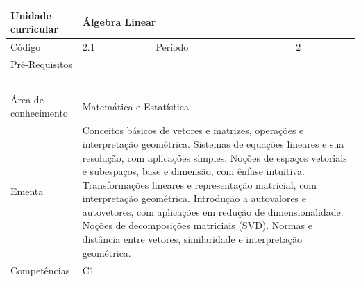 \begin{quadro}[ht!]
  \centering\scriptsize
\caption{Unidade Curricular Álgebra Linear}

\begin{tabular}{|p{2.5cm}|p{2.5cm}|p{2.5cm}|p{2.5cm}|p{2.5cm}|}\hline

  Unidade curricular & \multicolumn{4}{p{10cm}|}{ Álgebra Linear }\\\hline
  Código & 2.1 & Período & \multicolumn{2}{p{5cm}|}{ 2 }\\\hline
  Pré-Requisitos & \multicolumn{4}{p{10cm}|}{  } \\\hline
  \cellcolor{blue1}{ CH PRESENCIAL } &
    \cellcolor{blue1}{CH EAD Síncrona} &
    \cellcolor{blue1}{CH EAD Síncrona Mediada} &
    \cellcolor{blue1}{CH EAD Assíncrona} &
    \cellcolor{blue1}{CH APCC} \\\hline
  \cellcolor{blue1}{ 45 } &
    \cellcolor{blue1}{ 0 } &
    \cellcolor{blue1}{ 0 } &
    \cellcolor{blue1}{ 0 } &
    \cellcolor{blue1}{0} \\\hline
  \cellcolor{blue1}{ CH Teórica } &
    \cellcolor{blue1}{CH Prática} &
    \cellcolor{blue1}{CH Humanidades} &
    \cellcolor{blue1}{CH Extensão} &
    \cellcolor{blue1}{CH EAD TOTAL} \\\hline
  \cellcolor{blue1}{ 45 } &
    \cellcolor{blue1}{ 0 } &
    \cellcolor{blue1}{ 0 } &
    \cellcolor{blue1}{ 0 } &
    \cellcolor{blue1}{ 0 } \\\hline
  \cellcolor{blue1}{CARGA-HORÁRIA TOTAL} & \multicolumn{4}{p{10cm}|}{ \cellcolor{blue1}{ 45 } } \\\hline
  Área de conhecimento & \multicolumn{4}{p{10cm}|}{ Matemática e Estatística } \\\hline
  Ementa & \multicolumn{4}{p{10cm}|}{ Conceitos básicos de vetores e matrizes, operações e interpretação geométrica. Sistemas de equações lineares e sua resolução, com aplicações simples. Noções de espaços vetoriais e subespaços, base e dimensão, com ênfase intuitiva. Transformações lineares e representação matricial, com interpretação geométrica. Introdução a autovalores e autovetores, com aplicações em redução de dimensionalidade. Noções de decomposições matriciais (SVD). Normas e distância entre vetores, similaridade e interpretação geométrica.  } \\\hline
  Competências & \multicolumn{4}{p{10cm}|}{ C1 } \\\hline


  
	\end{tabular}

\end{quadro}


